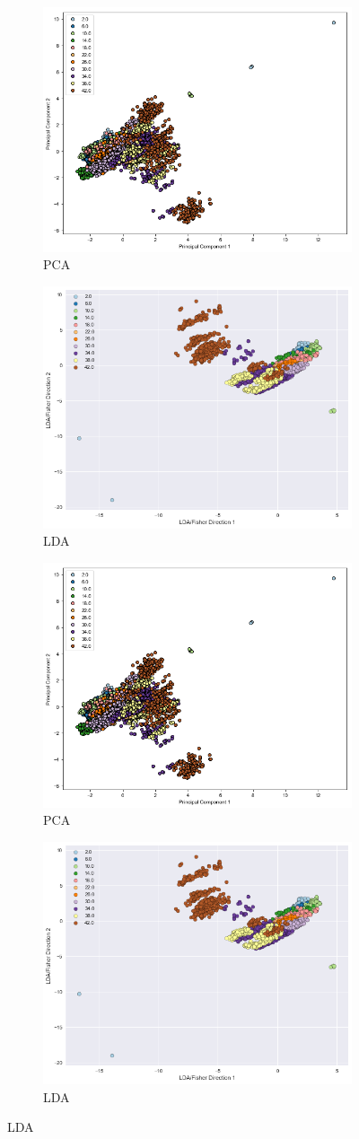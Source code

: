 \begin{figure}[ht!]
\centering
\begin{subfigure}{.5\textwidth}
  \centering
  \includegraphics[width=.4\linewidth]{figures/pca.png}
  \caption{PCA}
  \label{fig:sub1}
\end{subfigure}%
\begin{subfigure}{.5\textwidth}
  \centering
  \includegraphics[width=.4\linewidth]{figures/lda.png}
  \caption{LDA}
  \label{fig:sub2}
\end{subfigure}

\begin{subfigure}{.5\textwidth}
  \centering
  \includegraphics[width=.4\linewidth]{figures/pca.png}
  \caption{PCA}
  \label{fig:sub1}
\end{subfigure}%
\begin{subfigure}{.5\textwidth}
  \centering
  \includegraphics[width=.4\linewidth]{figures/lda.png}
  \caption{LDA}
  \label{fig:sub2}
\end{subfigure}


\end{figure}
